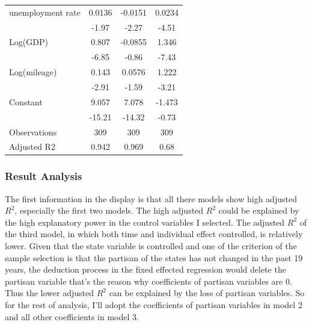 \begin{table}[htbp]
\begin{tabular}{p{6.93em}ccc}
    unemployment rate             & 0.0136                                & -0.0151                             & 0.0234                               \\
    \multicolumn{1}{c}{}          & -1.97                                 & -2.27                               & -4.51                                \\
    Log(GDP)                      & 0.807                                 & -0.0855                             & 1.346                                \\
    \multicolumn{1}{c}{}          & -6.85                                 & -0.86                               & -7.43                                \\
    Log(mileage)                  & 0.143                                 & 0.0576                              & 1.222                                \\
    \multicolumn{1}{c}{}          & -2.91                                 & -1.59                               & -3.21                                \\
    Constant                      & 9.057                                 & 7.078                               & -1.473                               \\
    \multicolumn{1}{c}{}          & -15.21                                & -14.32                              & -0.73                                \\
    \midrule
    Observations                  & 309                                   & 309                                 & 309                                  \\
    Adjusted R2                   & 0.942                                 & 0.969                               & 0.68                                 \\
    \bottomrule
  \end{tabular}%
  \label{Table 2.8}%
\end{table}%

\subsubsection{Result Analysis}
The first information in the display is that all there models show high adjusted $R^2$, especially the first two models. The high adjusted $R^2$ could be explained by the high explanatory power in the control variables I selected. The adjusted $R^2$ of the third model, in which both time and individual effect controlled, is relatively lower. Given that the state variable is controlled and one of the criterion of the sample selection is that the partisan of the states has not changed in the past 19 years, the deduction process in the fixed effected regression would delete the partisan variable that's the reason why coefficients of partisan variables are 0. Thus the lower adjusted $R^2$ can be explained by the loss of partisan variables. So for the rest of analysis, I'll adopt the coefficients of partisan variables in model 2 and all other coefficients in model 3.

